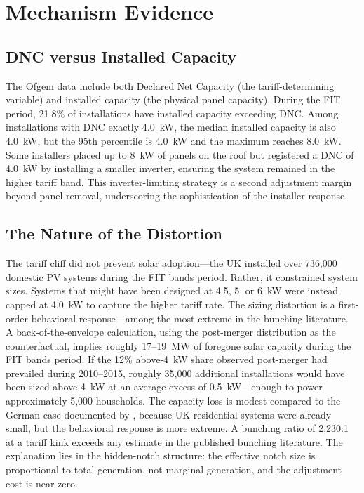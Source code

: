 \documentclass[12pt]{article}
\begin{document}
\section{Mechanism Evidence}
\label{sec:mechanisms}

\subsection{DNC versus Installed Capacity}

The Ofgem data include both Declared Net Capacity (the tariff-determining variable) and installed capacity (the physical panel capacity). During the FIT period, 21.8\% of installations have installed capacity exceeding DNC. Among installations with DNC exactly 4.0~kW, the median installed capacity is also 4.0~kW, but the 95th percentile is 4.0~kW and the maximum reaches 8.0~kW. Some installers placed up to 8~kW of panels on the roof but registered a DNC of 4.0~kW by installing a smaller inverter, ensuring the system remained in the higher tariff band. This inverter-limiting strategy is a second adjustment margin beyond panel removal, underscoring the sophistication of the installer response.

\subsection{The Nature of the Distortion}

The tariff cliff did not prevent solar adoption---the UK installed over 736,000 domestic PV systems during the FIT bands period. Rather, it constrained system sizes. Systems that might have been designed at 4.5, 5, or 6~kW were instead capped at 4.0~kW to capture the higher tariff rate. The sizing distortion is a first-order behavioral response---among the most extreme in the bunching literature. A back-of-the-envelope calculation, using the post-merger distribution as the counterfactual, implies roughly 17--19~MW of foregone solar capacity during the FIT bands period. If the 12\% above-4~kW share observed post-merger had prevailed during 2010--2015, roughly 35,000 additional installations would have been sized above 4~kW at an average excess of 0.5~kW---enough to power approximately 5,000 households. The capacity loss is modest compared to the German case documented by \citet{klimsa2024tax}, because UK residential systems were already small, but the behavioral response is more extreme. A bunching ratio of 2,230:1 at a tariff kink exceeds any estimate in the published bunching literature. The explanation lies in the hidden-notch structure: the effective notch size is proportional to total generation, not marginal generation, and the adjustment cost is near zero.
\end{document}

